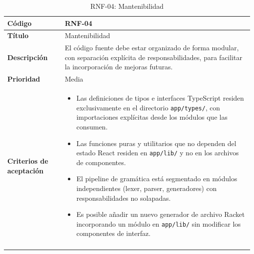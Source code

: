 \begin{longtable}{|>{\bfseries}p{3cm}|p{11cm}|}
\hline
\textbf{Código} & RNF-04 \\
\hline
\textbf{Título} & Mantenibilidad \\
\hline
\textbf{Descripción} & El código fuente debe estar organizado de forma modular, con separación explícita de responsabilidades, para facilitar la incorporación de mejoras futuras. \\
\hline
\textbf{Prioridad} & Media \\
\hline
\textbf{Criterios de aceptación} &
\begin{itemize}[leftmargin=*,topsep=2pt,itemsep=1pt,parsep=0pt]
    \item Las definiciones de tipos e interfaces TypeScript residen exclusivamente en el directorio \texttt{app/types/}, con importaciones explícitas desde los módulos que las consumen.
    \item Las funciones puras y utilitarios que no dependen del estado React residen en \texttt{app/lib/} y no en los archivos de componentes.
    \item El pipeline de gramática está segmentado en módulos independientes (lexer, parser, generadores) con responsabilidades no solapadas.
    \item Es posible añadir un nuevo generador de archivo Racket incorporando un módulo en \texttt{app/lib/} sin modificar los componentes de interfaz.
\end{itemize} \\
\hline
\caption{RNF-04: Mantenibilidad}
\label{tab:rnf04}
\end{longtable}

